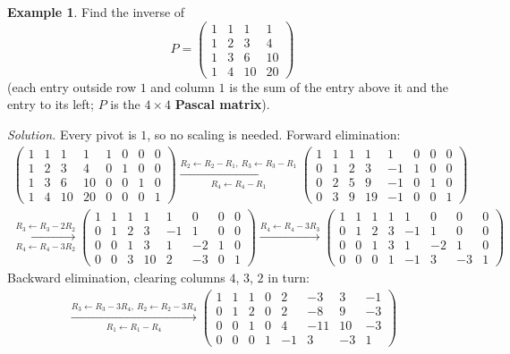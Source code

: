 \documentclass[12pt]{article}
\theoremstyle{definition}
\newtheorem{example}[theorem]{Example}
\begin{document}
\begin{example}\label{r2-exm-inverse-4x4}
Find the inverse of
\[
P=\begin{pmatrix}1&1&1&1\\1&2&3&4\\1&3&6&10\\1&4&10&20\end{pmatrix}
\]
(each entry outside row \(1\) and column \(1\) is the sum of the entry above it and the entry
to its left; \(P\) is the \(4\times4\) \textbf{Pascal matrix}).

\textit{Solution.} Every pivot is \(1\), so no scaling is needed. Forward elimination:
\[
\begin{gathered}
\left(\begin{array}{cccc|cccc}1&1&1&1&1&0&0&0\\1&2&3&4&0&1&0&0\\1&3&6&10&0&0&1&0\\1&4&10&20&0&0&0&1\end{array}\right)
\xrightarrow[R_4\leftarrow R_4-R_1]{R_2\leftarrow R_2-R_1,\ R_3\leftarrow R_3-R_1}
\left(\begin{array}{cccc|cccc}1&1&1&1&1&0&0&0\\0&1&2&3&-1&1&0&0\\0&2&5&9&-1&0&1&0\\0&3&9&19&-1&0&0&1\end{array}\right)
\\
\xrightarrow[R_4\leftarrow R_4-3R_2]{R_3\leftarrow R_3-2R_2}
\left(\begin{array}{cccc|cccc}1&1&1&1&1&0&0&0\\0&1&2&3&-1&1&0&0\\0&0&1&3&1&-2&1&0\\0&0&3&10&2&-3&0&1\end{array}\right)
\xrightarrow{R_4\leftarrow R_4-3R_3}
\left(\begin{array}{cccc|cccc}1&1&1&1&1&0&0&0\\0&1&2&3&-1&1&0&0\\0&0&1&3&1&-2&1&0\\0&0&0&1&-1&3&-3&1\end{array}\right)
\end{gathered}
\]
Backward elimination, clearing columns \(4\), \(3\), \(2\) in turn:
\[
\begin{gathered}
\xrightarrow[R_1\leftarrow R_1-R_4]{R_3\leftarrow R_3-3R_4,\ R_2\leftarrow R_2-3R_4}
\left(\begin{array}{cccc|cccc}1&1&1&0&2&-3&3&-1\\0&1&2&0&2&-8&9&-3\\0&0&1&0&4&-11&10&-3\\0&0&0&1&-1&3&-3&1\end{array}\right)

\end{gathered}\]
\end{example}
\end{document}
